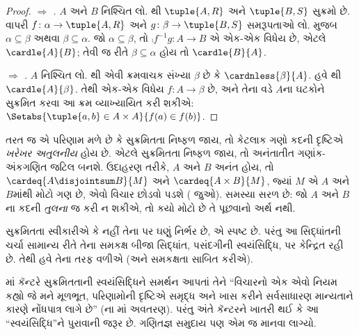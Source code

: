 \begin{proof}
\emph{ $\Rightarrow$ .}
$A$ અને $B$ નિશ્ચિત લો. થી
$\tuple{A, R}$ અને $\tuple{B, S}$ સુક્રમો છે.
વાપરી $f \colon \alpha \to \tuple{A, R}$
અને $g \colon \beta \to \tuple{B, S}$
સમરૂપતાઓ લો.
મુજબ $\alpha \subseteq \beta$ અથવા
$\beta \subseteq \alpha$. જો
$\alpha \subseteq \beta$, તો
$\comp{f^{-1}}{g} \colon A \to B$
એ એક-એક વિધેય છે, એટલે
$\cardle{A}{B}$; તેવી જ રીતે
$\beta \subseteq \alpha$ હોય તો
$\cardle{B}{A}$.

\emph{ $\Rightarrow$ .}
$A$ નિશ્ચિત લો. થી
એવી ક્રમવાચક સંખ્યા $\beta$ છે કે
$\cardnless{\beta}{A}$. હવે
થી
$\cardle{A}{\beta}$. તેથી એક-એક વિધેય
$f \colon A \to \beta$ છે, અને તેના વડે
$A$ના ઘટકોને સુક્રમિત કરવા આ ક્રમ
વ્યાખ્યાયિત કરી શકીએ:
$\Setabs{\tuple{a, b} \in A \times A}{f(a)
\in f(b)}$.
\end{proof}
\noindent
તરત જ એ પરિણામ મળે છે કે સુક્રમિતતા
નિષ્ફળ જાય, તો કેટલાક ગણો કદની દૃષ્ટિએ
\emph{ખરેખર અતુલનીય} હોય છે. એટલે
સુક્રમિતતા નિષ્ફળ જાય, તો અનંતાતીત
ગણાંક-અંકગણિત જટિલ બનશે. ઉદાહરણ તરીકે,
$A$ અને $B$ અનંત હોય, તો
$\cardeq{A \disjointsum B}{M}$ અને
$\cardeq{A \times B}{M}$, જ્યાં
$M$ એ $A$ અને $B$માંથી મોટો ગણ છે,
એવો વિચાર છોડવો પડશે
( જુઓ).
સમસ્યા સરળ છે: જો $A$ અને $B$ના કદની
\emph{તુલના} જ કરી ન શકીએ, તો કયો મોટો
છે તે પૂછવાનો અર્થ નથી.
\endgroup

\begingroup
\makeatletter{}\makeatother

\label{guunit:OLP-0596}


સુક્રમિતતા સ્વીકારીએ કે નહીં તેના પર ઘણું
નિર્ભર છે, એ સ્પષ્ટ છે. પરંતુ આ સિદ્ધાંતની
ચર્ચા સામાન્ય રીતે તેના સમકક્ષ બીજા સિદ્ધાંત,
પસંદગીની સ્વયંસિદ્ધિ, પર કેન્દ્રિત રહી છે.
તેથી હવે તેના તરફ વળીએ (અને સમકક્ષતા
સાબિત કરીએ).

\citeyear{Cantor1883}માં કૅન્ટરે સુક્રમિતતાની
સ્વયંસિદ્ધિને સમર્થન આપતાં તેને ``વિચારનો
એક એવો નિયમ કહ્યો જે મને મૂળભૂત,
પરિણામોની દૃષ્ટિએ સમૃદ્ધ અને ખાસ કરીને
સર્વસાધારણ માન્યતાને કારણે નોંધપાત્ર લાગે છે''
(\citeauthor{Potter2004}ના
\citeyear[p.~243]{Potter2004}માં અવતરણ).
પરંતુ અંતે કૅન્ટરને ખાતરી થઈ કે આ
``સ્વયંસિદ્ધિ''ને પુરાવાની જરૂર છે.
ગણિતજ્ઞ સમુદાય પણ એમ જ માનવા લાગ્યો.

